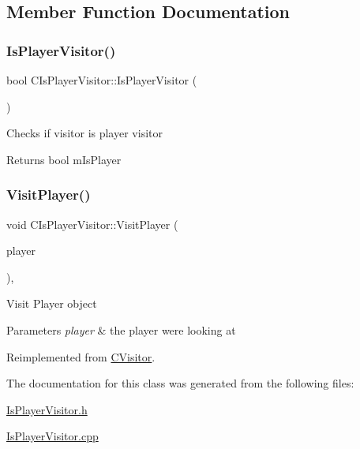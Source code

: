 \subsection{Member Function Documentation}
\mbox{\label{class_c_is_player_visitor_ad5fa4aa38887229cca980a8c362e3ff8}} 
\subsubsection{\texorpdfstring{IsPlayerVisitor()}{IsPlayerVisitor()}}
{\footnotesize\ttfamily bool C\+Is\+Player\+Visitor\+::\+Is\+Player\+Visitor (\begin{DoxyParamCaption}{ }\end{DoxyParamCaption})\hspace{0.3cm}{\ttfamily [inline]}}

Checks if visitor is player visitor \begin{DoxyReturn}{Returns}
bool m\+Is\+Player 
\end{DoxyReturn}
\mbox{\label{class_c_is_player_visitor_ade10af41a195ead29f30ed6fffb4c3bd}} 
\subsubsection{\texorpdfstring{VisitPlayer()}{VisitPlayer()}}
{\footnotesize\ttfamily void C\+Is\+Player\+Visitor\+::\+Visit\+Player (\begin{DoxyParamCaption}\item[{\mbox{\hyperlink{class_c_player}{C\+Player}} $\ast$}]{player }\end{DoxyParamCaption})\hspace{0.3cm}{\ttfamily [override]}, {\ttfamily [virtual]}}

Visit Player object 
\begin{DoxyParams}{Parameters}
{\em player} & the player we\textquotesingle{}re looking at \\
\hline
\end{DoxyParams}


Reimplemented from \mbox{\hyperlink{class_c_visitor_af177b31b3af36c3eeb8eb70fef63a75c}{C\+Visitor}}.



The documentation for this class was generated from the following files\+:\begin{DoxyCompactItemize}
\item 
\mbox{\hyperlink{_is_player_visitor_8h}{Is\+Player\+Visitor.\+h}}\item 
\mbox{\hyperlink{_is_player_visitor_8cpp}{Is\+Player\+Visitor.\+cpp}}\end{DoxyCompactItemize}
